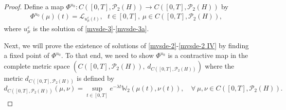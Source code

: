 \documentclass[11pt]{article}
\numberwithin{equation}{section}
\theoremstyle{plain}
\begin{document}
\begin{proof}
  Define a  map
    $\Phi^{u_0} : C( [0,T], \mathcal{P}_2(H) ) \rightarrow C( [0,T], \mathcal{P}_2(H) )$
  by
 \begin{align} \label{map}
     \Phi^{u_0} (\mu)(t) = \mathcal{L}_{u_\mu^\varepsilon(t)},
                          \ \ \
                                 t\in [0, T], \  \mu \in C( [0,T], \mathcal{P}_2(H) ),
 \end{align}
 where $u_\mu^\varepsilon$ is the solution of \eqref{mvsde-3}-\eqref{mvsde-3a}.


Next, we will prove the existence of
solutions of \eqref{mvsde-2}-\eqref{mvsde-2 IV}
by finding a fixed point
of   $\Phi^{u_0}$.
To that end, we need  to show
  $\Phi^{u_0}$ is a contractive map
 in the complete  metric  space
 $ (C( [0,T], \mathcal{P}_2(H) ),
 \ d_{C( [0,T], \mathcal{P}_2(H) )})$ where the metric
 $ d_{C( [0,T], \mathcal{P}_2(H) )}$ is defined  by
$$ d_{C( [0,T], \mathcal{P}_2(H) )} (\mu, \nu) = \sup_{t \in [0,T]} e^{-\lambda t} \mathbb{W}_2 \left( \mu(t), \nu(t) \right),
\quad \forall \ \mu, \nu \in C( [0,T], \mathcal{P}_2(H) ).
$$




\end{proof}
\end{document}
